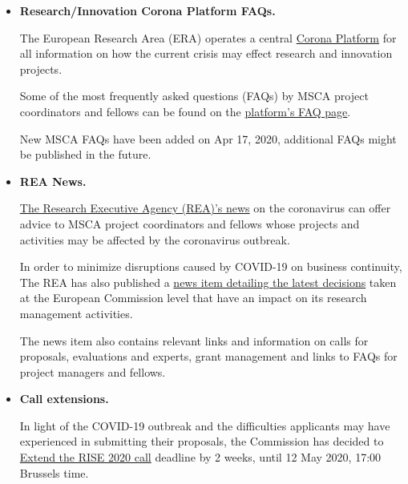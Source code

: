 \documentclass[oneside]{book}
\numberwithin{equation}{section}
\begin{document}
\begin{itemize}
    MSCA projects can upload their results and related information, e.g., their needs to develop them further and relevance for policy making.
    
    MSCA projects can find guidance on how to upload their results to the platform in the \href{https://webgate.ec.europa.eu/funding/display/ECResearchGMS/Creating+a+Project+Result}{guidelines} available online.
    \item \textbf{Research/Innovation Corona Platform FAQs.}
    
    The European Research Area (ERA) operates a central \href{https://ec.europa.eu/info/funding-tenders/opportunities/portal/screen/covid-19}{Corona Platform} for all information on how the current crisis may effect research and innovation projects.
    
    Some of the most frequently asked questions (FAQs) by MSCA project coordinators and fellows can be found on the \href{https://ec.europa.eu/info/funding-tenders/opportunities/portal/screen/support/faq;type=1;categories=;programme=null;actions=;keyword=covid}{platform's FAQ page}.
    
    New MSCA FAQs have been added on Apr 17, 2020, additional FAQs might be published in the future.
    \item \textbf{REA News.}
    
    \href{https://ec.europa.eu/info/news/covid-19-implications-your-msca-project-2020-mar-16_en?fbclid=IwAR1GgsbNJkI7jLCHa18VDIXX_OAlR0_soWsN3LvzzYdulnT_Im5umE_GPGE}{The Research Executive Agency (REA)'s news} on the coronavirus can offer advice to MSCA project coordinators and fellows whose projects and activities may be affected by the coronavirus outbreak.
    
    In order to minimize disruptions caused by COVID-19 on business continuity, The REA has also published a \href{https://ec.europa.eu/info/news/covid-19-research-executive-agency-business-continuity-measures-2020-mar-18_en}{news item detailing the latest decisions} taken at the European Commission level that have an impact on its research management activities.
    
    The news item also contains relevant links and information on calls for proposals, evaluations and experts, grant management and links to FAQs for project managers and fellows.
    \item \textbf{Call extensions.}
    
    In light of the COVID-19 outbreak and the difficulties applicants may have experienced in submitting their proposals, the Commission has decided to \href{https://ec.europa.eu/research/mariecurieactions/news/RISE-2020-deadline-extended_en}{Extend the RISE 2020 call} deadline by 2 weeks, until 12 May 2020, 17:00 Brussels time.    
\end{itemize}
\end{document}
